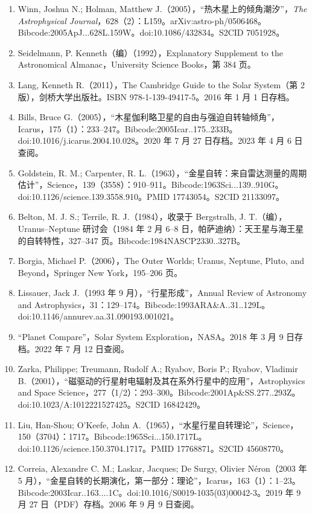 \begin{enumerate}
\item Winn, Joshua N.; Holman, Matthew J.（2005），“热木星上的倾角潮汐”，\textit{The Astrophysical Journal}，628（2）：L159。arXiv:astro-ph/0506468。Bibcode:2005ApJ...628L.159W。doi:10.1086/432834。S2CID 7051928。
\item Seidelmann, P. Kenneth（编）（1992），Explanatory Supplement to the Astronomical Almanac，University Science Books，第 384 页。
\item Lang, Kenneth R.（2011），The Cambridge Guide to the Solar System（第 2 版），剑桥大学出版社。ISBN 978-1-139-49417-5。2016 年 1 月 1 日存档。
\item Bills, Bruce G.（2005），“木星伽利略卫星的自由与强迫自转轴倾角”，Icarus，175（1）：233–247。Bibcode:2005Icar..175..233B。doi:10.1016/j.icarus.2004.10.028。2020 年 7 月 27 日存档。2023 年 4 月 6 日查阅。
\item Goldstein, R. M.; Carpenter, R. L.（1963），“金星自转：来自雷达测量的周期估计”，Science，139（3558）：910–911。Bibcode:1963Sci...139..910G。doi:10.1126/science.139.3558.910。PMID 17743054。S2CID 21133097。
\item Belton, M. J. S.; Terrile, R. J.（1984），收录于 Bergstralh, J. T.（编），Uranus–Neptune 研讨会（1984 年 2 月 6–8 日，帕萨迪纳）：天王星与海王星的自转特性，327–347 页。Bibcode:1984NASCP2330..327B。
\item Borgia, Michael P.（2006），The Outer Worlds; Uranus, Neptune, Pluto, and Beyond，Springer New York，195–206 页。
\item Lissauer, Jack J.（1993 年 9 月），“行星形成”，Annual Review of Astronomy and Astrophysics，31：129–174。Bibcode:1993ARA&A..31..129L。doi:10.1146/annurev.aa.31.090193.001021。
\item “Planet Compare”，Solar System Exploration，NASA。2018 年 3 月 9 日存档。2022 年 7 月 12 日查阅。
\item Zarka, Philippe; Treumann, Rudolf A.; Ryabov, Boris P.; Ryabov, Vladimir B.（2001），“磁驱动的行星射电辐射及其在系外行星中的应用”，Astrophysics and Space Science，277（1/2）：293–300。Bibcode:2001Ap&SS.277..293Z。doi:10.1023/A:1012221527425。S2CID 16842429。
\item Liu, Han-Shou; O'Keefe, John A.（1965），“水星行星自转理论”，Science，150（3704）：1717。Bibcode:1965Sci...150.1717L。doi:10.1126/science.150.3704.1717。PMID 17768871。S2CID 45608770。
\item Correia, Alexandre C. M.; Laskar, Jacques; De Surgy, Olivier Néron（2003 年 5 月），“金星自转的长期演化，第一部分：理论”，Icarus，163（1）：1–23。Bibcode:2003Icar..163....1C。doi:10.1016/S0019-1035(03)00042-3。2019 年 9 月 27 日（PDF）存档。2006 年 9 月 9 日查阅。

\end{enumerate}
